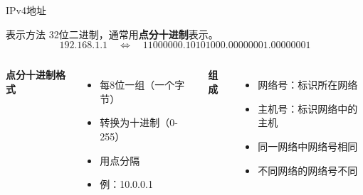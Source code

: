 \documentclass[10pt, aspectratio=169]{beamer}
\begin{document}
\begin{frame}{IPv4地址}
    \begin{block}{表示方法}
        32位二进制，通常用\textbf{点分十进制}表示。
        \[
        192.168.1.1 \quad \Leftrightarrow \quad 11000000.10101000.00000001.00000001
        \]
    \end{block}
    \vspace{0.5em}
    \begin{columns}[t]
        \textbf{点分十进制格式}
        \begin{itemize}
            \item 每8位一组（一个字节）
            \item 转换为十进制（0-255）
            \item 用点分隔
            \item 例：10.0.0.1
        \end{itemize}
        \textbf{组成}
        \begin{itemize}
            \item 网络号：标识所在网络
            \item 主机号：标识网络中的主机
            \item 同一网络中网络号相同
            \item 不同网络的网络号不同
        \end{itemize}
    \end{columns}
\end{frame}
\end{document}
